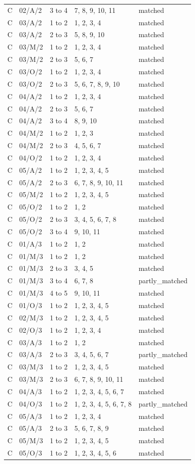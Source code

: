 \documentclass[10pt,a4paper]{article}
\begin{document}
{\begin{longtable}[]{@{}lllll@{}}
C & 02/A/2 & 3 to 4 & 7, 8, 9, 10, 11 & matched \\
C & 03/A/2 & 1 to 2 & 1, 2, 3, 4 & matched \\
C & 03/A/2 & 2 to 3 & 5, 8, 9, 10 & matched \\
C & 03/M/2 & 1 to 2 & 1, 2, 3, 4 & matched \\
C & 03/M/2 & 2 to 3 & 5, 6, 7 & matched \\
C & 03/O/2 & 1 to 2 & 1, 2, 3, 4 & matched \\
C & 03/O/2 & 2 to 3 & 5, 6, 7, 8, 9, 10 & matched \\
C & 04/A/2 & 1 to 2 & 1, 2, 3, 4 & matched \\
C & 04/A/2 & 2 to 3 & 5, 6, 7 & matched \\
C & 04/A/2 & 3 to 4 & 8, 9, 10 & matched \\
C & 04/M/2 & 1 to 2 & 1, 2, 3 & matched \\
C & 04/M/2 & 2 to 3 & 4, 5, 6, 7 & matched \\
C & 04/O/2 & 1 to 2 & 1, 2, 3, 4 & matched \\
C & 05/A/2 & 1 to 2 & 1, 2, 3, 4, 5 & matched \\
C & 05/A/2 & 2 to 3 & 6, 7, 8, 9, 10, 11 & matched \\
C & 05/M/2 & 1 to 2 & 1, 2, 3, 4, 5 & matched \\
C & 05/O/2 & 1 to 2 & 1, 2 & matched \\
C & 05/O/2 & 2 to 3 & 3, 4, 5, 6, 7, 8 & matched \\
C & 05/O/2 & 3 to 4 & 9, 10, 11 & matched \\
C & 01/A/3 & 1 to 2 & 1, 2 & matched \\
C & 01/M/3 & 1 to 2 & 1, 2 & matched \\
C & 01/M/3 & 2 to 3 & 3, 4, 5 & matched \\
C & 01/M/3 & 3 to 4 & 6, 7, 8 & partly\_matched \\
C & 01/M/3 & 4 to 5 & 9, 10, 11 & matched \\
C & 01/O/3 & 1 to 2 & 1, 2, 3, 4, 5 & matched \\
C & 02/M/3 & 1 to 2 & 1, 2, 3, 4, 5 & matched \\
C & 02/O/3 & 1 to 2 & 1, 2, 3, 4 & matched \\
C & 03/A/3 & 1 to 2 & 1, 2 & matched \\
C & 03/A/3 & 2 to 3 & 3, 4, 5, 6, 7 & partly\_matched \\
C & 03/M/3 & 1 to 2 & 1, 2, 3, 4, 5 & matched \\
C & 03/M/3 & 2 to 3 & 6, 7, 8, 9, 10, 11 & matched \\
C & 04/A/3 & 1 to 2 & 1, 2, 3, 4, 5, 6, 7 & matched \\
C & 04/O/3 & 1 to 2 & 1, 2, 3, 4, 5, 6, 7, 8 & partly\_matched \\
C & 05/A/3 & 1 to 2 & 1, 2, 3, 4 & matched \\
C & 05/A/3 & 2 to 3 & 5, 6, 7, 8, 9 & matched \\
C & 05/M/3 & 1 to 2 & 1, 2, 3, 4, 5 & matched \\
C & 05/O/3 & 1 to 2 & 1, 2, 3, 4, 5, 6 & matched \\
\end{longtable}\normalsize
}
\end{document}
